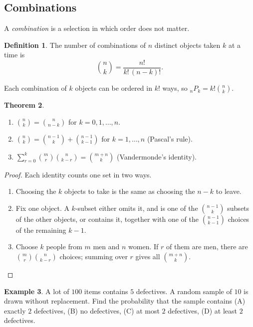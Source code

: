 \documentclass[12pt,a4paper]{report}
\theoremstyle{definition}
\newtheorem{thm}{Theorem}[section]
\newtheorem{definition}[thm]{Definition}
\newtheorem{example}[thm]{Example}
\theoremstyle{plain}
\theoremstyle{definition}
\begin{document}
\subsection{Combinations}

A \emph{combination} is a selection in which order does not matter.

\begin{definition}
\label{def:combination}
The number of combinations of $n$ distinct objects taken $k$ at a time is
\[\binom{n}{k} = \frac{n!}{k!\,(n - k)!} .\]
\end{definition}

Each combination of $k$ objects can be ordered in $k!$ ways, so ${}_nP_k = k!\binom nk$.

\begin{thm}
\label{thm:binomialidentities}
\begin{enumerate}
\item[(i)] $\binom nk = \binom{n}{n - k}$ for $k = 0, 1, \dots, n$.
\item[(ii)] $\binom nk = \binom{n - 1}{k} + \binom{n - 1}{k - 1}$ for $k = 1, \dots, n$
(Pascal's rule).
\item[(iii)] $\sum_{r=0}^k\binom mr\binom{n}{k - r} = \binom{m + n}{k}$ (Vandermonde's
identity).
\end{enumerate}
\end{thm}

\begin{proof}
Each identity counts one set in two ways.
\begin{enumerate}
\item[(i)] Choosing the $k$ objects to take is the same as choosing the $n - k$ to leave.
\item[(ii)] Fix one object. A $k$-subset either omits it, and is one of the $\binom{n - 1}{k}$
subsets of the other objects, or contains it, together with one of the $\binom{n - 1}{k - 1}$
choices of the remaining $k - 1$.
\item[(iii)] Choose $k$ people from $m$ men and $n$ women. If $r$ of them are men, there are
$\binom mr\binom{n}{k - r}$ choices; summing over $r$ gives all $\binom{m + n}{k}$.
\end{enumerate}
\end{proof}

\begin{example}
\label{ex:defectivelot}
A lot of $100$ items contains $5$ defectives. A random sample of $10$ is drawn without
replacement. Find the probability that the sample contains (A) exactly $2$ defectives,
(B) no defectives, (C) at most $2$ defectives, (D) at least $2$ defectives.
\end{example}
\end{document}
